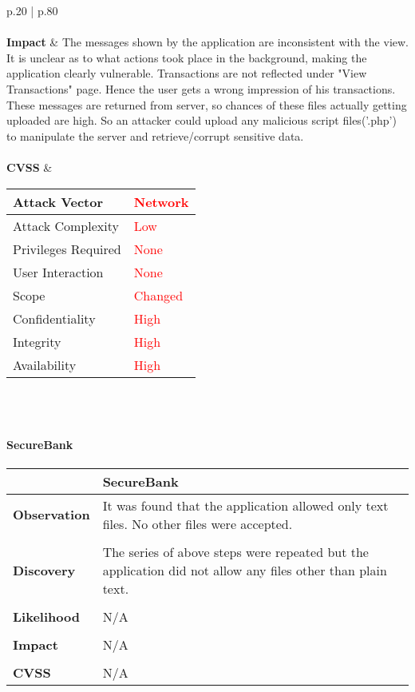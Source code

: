 \begin{longtable*}{p{.20\textwidth} | p{.80\textwidth}}
    \\\\
    \textbf{Impact} &
        The messages shown by the application are inconsistent with the view. It is unclear as to what actions took place in the background, making the application clearly vulnerable. Transactions are not reflected under "View Transactions" page. Hence the user gets a wrong impression of his transactions. These messages are returned from server, so chances of these files actually getting uploaded are high. So an attacker could upload any malicious script files('.php') to manipulate the server and retrieve/corrupt sensitive data.
    \\\\
    \textbf{CVSS} &
       \begin{tabular}{| l | l |}
             \hline
             Attack Vector		& \textcolor{red}{Network}\\
             \hline
             Attack Complexity	& \textcolor{red}{Low} \\
             \hline
             Privileges Required & \textcolor{red}{None} \\
             \hline
             User Interaction	& \textcolor{red}{None} \\
             \hline
             Scope		& \textcolor{red}{Changed} \\
             \hline
             Confidentiality	& \textcolor{red}{High} \\
             \hline
             Integrity		& \textcolor{red}{High} \\
             \hline
             Availability		& \textcolor{red}{High} \\
             \hline
             \end{tabular}
           \\
    \\
    \hline
\end{longtable*}
\paragraph{SecureBank} \mbox{}
\begin{longtable*}{p{.20\textwidth} | p{.80\textwidth}}
    \hline
    & \textbf{SecureBank} \\
    \hline
    \textbf{Observation} &
        It was found that the application allowed only text files. No other files were accepted.
    \\\\
    \textbf{Discovery} &
	    The series of above steps were repeated but the application did not allow any files other than plain text.
    \\\\
    \textbf{Likelihood} &
        N/A
    \\\\
    \textbf{Impact} &
		N/A
    \\\\
    \textbf{CVSS} &
        N/A
    \\
    \hline
\end{longtable*}
\clearpage
